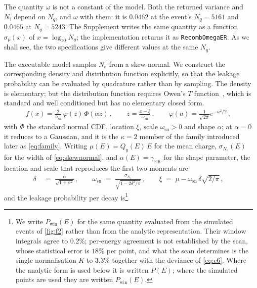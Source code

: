 \documentclass[11pt,a4paper]{article}
\begin{document}
The quantity \(\omega\) is not a constant of the model. Both the
returned variance and \(N_i\) depend on \(N_q\), and \(\omega\) with
them: it is \(0.0462\) at the event's \(N_q=5161\) and \(0.0465\) at
\(N_q=5243\). The Supplement writes the same quantity as a function
\(\sigma_p(x)\) of \(x=\log_{10}N_q\); the implementation returns it as
\texttt{RecombOmegaER}. As we shall see, the two specifications give
different values at the same \(N_q\).

The executable model samples \(N_e\) from a skew-normal. We construct the
corresponding density and distribution function explicitly, so that the
leakage probability can be evaluated by quadrature rather than by sampling.
The density is elementary; but the distribution function requires
Owen's \(T\) function~\cite{Owen}, which is standard and well conditioned
but has no elementary closed form.
\begin{align}
    \label{eq:skewnormal}
    f(x)=\frac{2}{\omega_\mathrm{sn}}\,\varphi(z)\,\Phi(\alpha z)\,, \qquad
    z=\frac{x-\xi}{\omega_\mathrm{sn}}\,,\qquad
    \varphi(u)=\frac{1}{\sqrt{2\pi}}e^{-u^{2}/2}\,,
\end{align}
with \(\Phi\) the standard normal CDF, location \(\xi\), scale
\(\omega_\mathrm{sn}>0\) and shape \(\alpha\); at \(\alpha=0\) it
reduces to a Gaussian, and it is the \(\kappa=2\) member of the family
introduced later as \cref{eq:family}. Writing \(\mu(E)=Q_y(E)\,E\) for
the mean charge, \(\sigma_{N_e}(E)\) for the width of
\cref{eq:skewnormal}, and \(\alpha(E)=\gamma_\mathrm{ER}\) for the shape
parameter, the location and scale that reproduces the first two moments
are
\begin{align}
    \label{eq:5a}
    \delta\;&=\;\frac{\alpha}{\sqrt{1+\alpha^{2}}}\,,\qquad    
    \omega_\mathrm{sn}\;=\;\frac{\sigma_{N_e}}{\sqrt{1-2\delta^{2}/\pi}}\,,\qquad
    \xi\;=\;\mu-\omega_\mathrm{sn}\,\delta\sqrt{2/\pi}\,,
\end{align}
and the leakage probability per decay is\footnote{%
We write \(P_\mathrm{win}(E)\) for the same quantity evaluated from the
simulated events of \cref{fig:f2} rather than from the analytic
representation. Their window integrals agree to \(0.2\%\); per-energy
agreement is not established by the scan, whose statistical error is
\(18\%\) per point, and what the scan determines is the single
normalisation \(K\) to \(3.3\%\) together with the deviance of
\cref{eq:e6}.
Where the analytic form is used below it is written \(P(E)\);
where the simulated points are used they are written
\(P_\mathrm{win}(E)\).}
\end{document}
